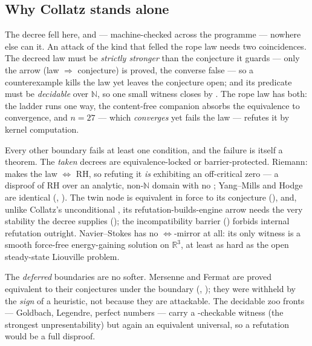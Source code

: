 \subsection{Why Collatz stands alone}
The decree fell here, and --- machine-checked across the programme --- nowhere else can it. An attack of the kind that
felled the rope law needs two coincidences. The decreed law must be \emph{strictly stronger} than the conjecture it guards
--- only the arrow (law $\Rightarrow$ conjecture) is proved, the converse false --- so a counterexample kills the law yet
leaves the conjecture open; and its predicate must be \emph{decidable} over $\mathbb{N}$, so one small witness closes by
. The rope law has both: the ladder  runs one way, the content-free
companion  absorbs the equivalence to convergence, and $n=27$ --- which \emph{converges}
yet fails the law --- refutes it by kernel computation.

Every other boundary fails at least one condition, and the failure is itself a theorem. The \emph{taken} decrees are
equivalence-locked or barrier-protected. Riemann:  makes the law
$\Leftrightarrow$ RH, so refuting it \emph{is} exhibiting an off-critical zero --- a disproof of RH over an analytic,
non-$\mathbb{N}$ domain with no ; Yang--Mills and Hodge are identical
(, ). The twin node is equivalent in force to its
conjecture (), and, unlike Collatz's unconditional
, its refutation-builds-engine arrow needs the very stability the decree
supplies (); the incompatibility barrier
() forbids internal refutation outright. Navier--Stokes has no
$\Leftrightarrow$-mirror at all: its only witness is a smooth force-free energy-gaining solution on $\mathbb{R}^3$, at least
as hard as the open steady-state Liouville problem.

The \emph{deferred} boundaries are no softer. Mersenne and Fermat are proved equivalent to their conjectures under the
boundary (,
); they were withheld by the \emph{sign} of a heuristic, not
because they are attackable. The decidable zoo fronts --- Goldbach, Legendre, perfect numbers --- carry a
-checkable witness (the strongest unpresentability) but again an equivalent universal, so a refutation would be
a full disproof.

